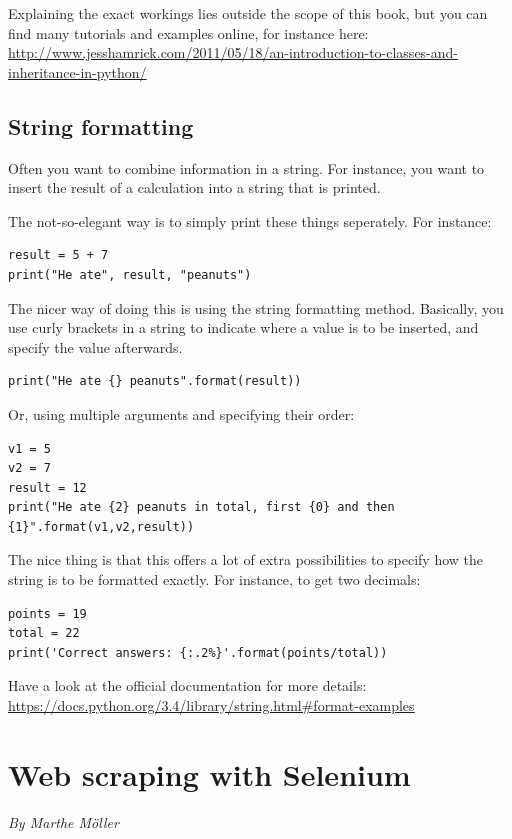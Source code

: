 \documentclass[a4paper,12pt]{book}
\begin{document}
\begin{appendices}
Explaining the exact workings lies outside the scope of this book, but you can find many tutorials and examples online, for instance here:
 \url{http://www.jesshamrick.com/2011/05/18/an-introduction-to-classes-and-inheritance-in-python/}


\section{String formatting}
\label{sec:stringformatting}
Often you want to combine information in a string. For instance, you want to insert the result of a calculation into a string that is printed.

The not-so-elegant way is to simply print these things seperately. For instance:

\begin{lstlisting}
result = 5 + 7 
print("He ate", result, "peanuts")
\end{lstlisting}

The nicer way of doing this is using the string formatting method. Basically, you use curly brackets in a string to indicate where a value is to be inserted, and specify the value afterwards.


\begin{lstlisting}
print("He ate {} peanuts".format(result))
\end{lstlisting}

Or, using multiple arguments and specifying their order:

\begin{lstlisting}
v1 = 5
v2 = 7
result = 12
print("He ate {2} peanuts in total, first {0} and then {1}".format(v1,v2,result))
\end{lstlisting}

The nice thing is that this offers a lot of extra possibilities to specify how the string is to be formatted exactly. For instance, to get two decimals:

\begin{lstlisting}
points = 19
total = 22
print('Correct answers: {:.2%}'.format(points/total))
\end{lstlisting}

Have a look at the official documentation for more details: 
\url{https://docs.python.org/3.4/library/string.html#format-examples}


\chapter{Web scraping with Selenium}
\label{chap:selenium}
\emph{By Marthe M\"oller}\\




\end{appendices}
\end{document}

